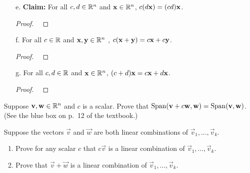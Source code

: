 \newpage

\begin{enumerate}
\item[e.] {\bf Claim:}
For all $c, d \in \mathbb{R}^n$ and $\mathbf{x} \in \mathbb{R}^n$, $c(d\mathbf{x}) = (cd)\mathbf{x}$.
\begin{proof}
  ~
\vskip5cm
\end{proof}
\item[f.] 
For all $c \in \mathbb{R}$ and $\mathbf{x}, \mathbf{y} \in \mathbb{R}^n$ , $c(\mathbf{x} + \mathbf{y}) = c\mathbf{x} + c\mathbf{y}$.
\begin{proof}
  ~
\vskip5cm
\end{proof}
\item[g.] 
For all $c, d \in \mathbb{R}$ and $\mathbf{x} \in \mathbb{R}^n$, $(c + d)\mathbf{x} = c\mathbf{x} + d\mathbf{x}$.
\begin{proof}
  ~
\vskip5cm
\end{proof}

\end{enumerate}



\newpage

\begin{problem}[SA 1.1.21]
Suppose $\mathbf{v}, \mathbf{w} \in \mathbb{R}^n$ and $c$ is a scalar. Prove that 
$\operatorname{Span} (\mathbf{v} + c\mathbf{w},\mathbf{w}) = \operatorname{Span} (\mathbf{v},\mathbf{w})$. (See the blue box on p.~12 of the textbook.)
\end{problem}



\newpage

\begin{problem}[SA 1.1.22]
Suppose the vectors $\vec{v}$ and $\vec{w}$ are both linear combinations of 
$\vec{v}_1, \dots, \vec{v}_k$.
\begin{enumerate}
\item 
Prove for any scalar $c$ that $c\vec{v}$ is a linear combination of 
$\vec{v}_1,\dots, \vec{v}_k$.
\item
Prove that $\vec{v} + \vec{w}$ is a linear combination of 
$\vec{v}_1,\dots,\vec{v}_k$.
\end{enumerate}

\end{problem}

\newpage


